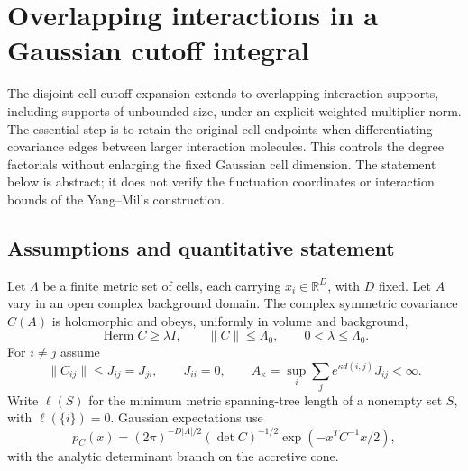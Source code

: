 \documentclass[11pt]{article}
\begin{document}

\section{Overlapping interactions in a Gaussian cutoff integral}
\label{oi-section}

The disjoint-cell cutoff expansion extends to overlapping interaction
supports, including supports of unbounded size, under an explicit
weighted multiplier norm. The essential step is to retain the original
cell endpoints when differentiating covariance edges between larger
interaction molecules. This controls the degree factorials without
enlarging the fixed Gaussian cell dimension. The statement below is
abstract; it does not verify the fluctuation coordinates or interaction
bounds of the Yang--Mills construction.

\subsection{Assumptions and quantitative statement}

Let $\Lambda$ be a finite metric set of cells, each carrying
$x_i\in\mathbb R^D$, with $D$ fixed. Let $A$ vary in an open complex
background domain. The complex symmetric covariance $C(A)$ is
holomorphic and obeys, uniformly in volume and background,
\begin{equation}\label{oi-covariance}
 \operatorname{Herm}C\ge\lambda I,\qquad
 \|C\|\le\Lambda_0,\qquad 0<\lambda\le\Lambda_0.
\end{equation}
For $i\ne j$ assume
\begin{equation}\label{oi-decay}
 \|C_{ij}\|\le J_{ij}=J_{ji},\qquad J_{ii}=0,\qquad
 A_\kappa=\sup_i\sum_j e^{\kappa d(i,j)}J_{ij}<\infty.
\end{equation}
Write $\ell(S)$ for the minimum metric spanning-tree length of a
nonempty set $S$, with $\ell(\{i\})=0$. Gaussian expectations use
\[
 p_C(x)=(2\pi)^{-D|\Lambda|/2}(\det C)^{-1/2}
                     \exp(-x^TC^{-1}x/2),
\]
with the analytic determinant branch on the accretive cone.
\end{document}
